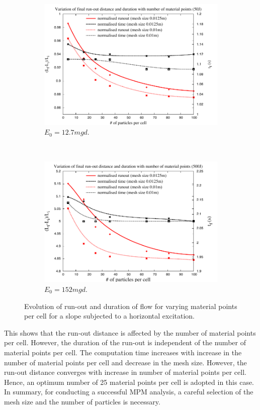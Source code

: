 \begin{figure}[tbhp]
\centering
\begin{subfigure}[b]{0.95\textwidth}
\includegraphics[width=\textwidth]{50}
\caption{$E_0=12.7mgd$.}
\label{fig:50}
\end{subfigure}
\\
\begin{subfigure}[b]{0.95\textwidth}
\centering
\includegraphics[width=\textwidth]{500}
\caption{$E_0=152mgd$.}
\label{fig:500}
\end{subfigure}
\caption{Evolution of run-out and duration of flow  for varying material points 
per cell for a slope subjected to a horizontal excitation.}
\label{fig:MPM_Size_Effect}
\end{figure}

This shows that the run-out distance is affected by the number of material 
points per cell. However, the duration of the run-out is independent of the 
number of material points per cell. The computation time increases with 
increase in the number of material points per cell and decrease in the mesh 
size. However, the run-out distance converges with increase in number of 
material points per cell. Hence, an optimum number of 25 material points per 
cell is adopted in this case. In summary, for conducting a successful MPM 
analysis, a careful selection of the mesh size and the number of particles is 
necessary.


